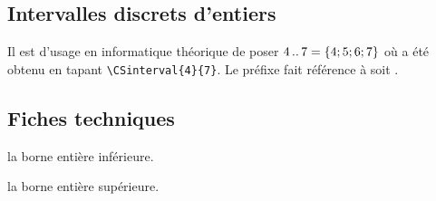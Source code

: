 \documentclass[12pt,a4paper]{article}
\begin{document}

\subsection{Intervalles discrets d'entiers}

Il est d'usage en informatique théorique de poser $4\,.\mkern0.2mu.\,7 = \{ 4 ; 5 ; 6 ; 7 \}$ où  a été obtenu en tapant \verb#\CSinterval{4}{7}#.
Le préfixe  fait référence à  soit .




\subsection{Fiches techniques}

   \hfill {}

 la borne entière inférieure.

 la borne entière supérieure.
\end{document}
